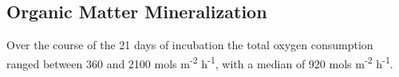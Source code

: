 \subsection{Organic Matter Mineralization}

Over the course of the 21 days of incubation the total oxygen consumption ranged between 360 and 2100 \sigma mols m\textsuperscript{-2} h\textsuperscript{-1}, with a median of 920 \mu mols m\textsuperscript{-2} h\textsuperscript{-1}.  